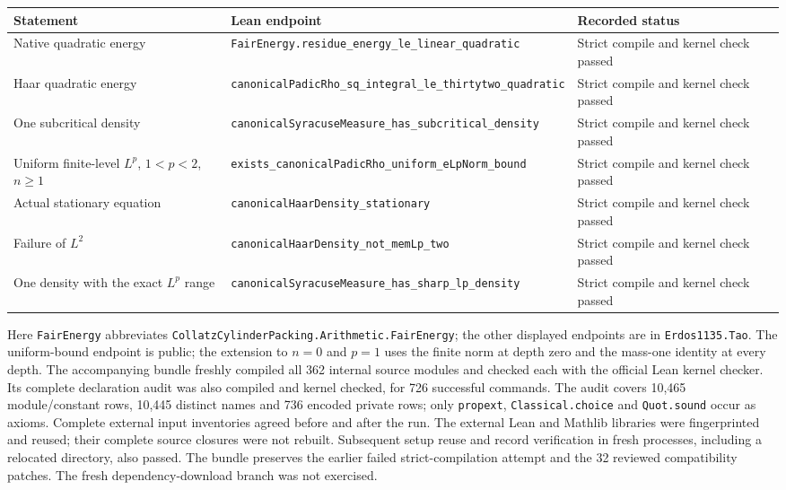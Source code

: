 \documentclass[11pt]{article}
\theoremstyle{remark}
\begin{document}
\begin{center}
\small
\begin{tabular}{@{}>{\raggedright\arraybackslash}p{}
  >{\raggedright\arraybackslash}p{}
  >{\raggedright\arraybackslash}p{}@{}}
\hline
Statement & Lean endpoint & Recorded status\\
\hline
Native quadratic energy &
\nolinkurl{FairEnergy.residue_energy_le_linear_quadratic} &
Strict compile and kernel check passed\\[5pt]
Haar quadratic energy &
\nolinkurl{canonicalPadicRho_sq_integral_le_thirtytwo_quadratic} &
Strict compile and kernel check passed\\[5pt]
One subcritical density &
\nolinkurl{canonicalSyracuseMeasure_has_subcritical_density} &
Strict compile and kernel check passed\\[5pt]
Uniform finite-level \(L^p\), \(1<p<2\), \(n\geq1\) &
\nolinkurl{exists_canonicalPadicRho_uniform_eLpNorm_bound} &
Strict compile and kernel check passed\\[5pt]
Actual stationary equation &
\nolinkurl{canonicalHaarDensity_stationary} &
Strict compile and kernel check passed\\[5pt]
Failure of \(L^2\) &
\nolinkurl{canonicalHaarDensity_not_memLp_two} &
Strict compile and kernel check passed\\[5pt]
One density with the exact \(L^p\) range &
\nolinkurl{canonicalSyracuseMeasure_has_sharp_lp_density} &
Strict compile and kernel check passed\\
\hline
\end{tabular}
\end{center}

Here \nolinkurl{FairEnergy} abbreviates
\nolinkurl{CollatzCylinderPacking.Arithmetic.FairEnergy}; the other
displayed endpoints are in \nolinkurl{Erdos1135.Tao}.
The uniform-bound endpoint is public; the extension to \(n=0\)
and \(p=1\) uses the finite norm at depth zero and the mass-one
identity at every depth.
The accompanying bundle freshly compiled all 362 internal source
modules and checked each with the official Lean kernel checker.
Its complete declaration audit was also compiled and kernel checked,
for 726 successful commands.  The audit covers 10,465 module/constant
rows, 10,445 distinct names and 736 encoded private rows;
only \nolinkurl{propext}, \nolinkurl{Classical.choice} and
\nolinkurl{Quot.sound} occur as axioms.  Complete external input
inventories agreed before and after the run.  The external Lean and
Mathlib libraries were fingerprinted and reused; their complete source
closures were not rebuilt.  Subsequent setup reuse and record verification
in fresh processes, including a relocated directory, also passed.
The bundle preserves the earlier failed strict-compilation attempt
and the 32 reviewed compatibility patches.  The fresh dependency-download
branch was not exercised.
\end{document}
